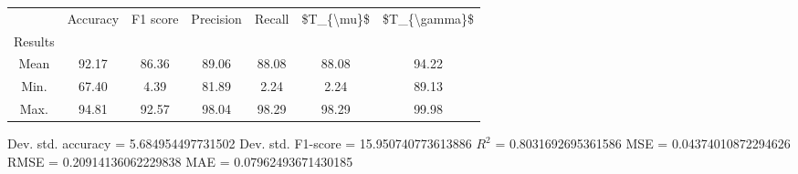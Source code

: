 \begin{tabular}{|c|c|c|c|c|c|c|}
\toprule
{} &  Accuracy &  F1 score &  Precision &  Recall &  \$T\_\{\textbackslash mu\}\$ &  \$T\_\{\textbackslash gamma\}\$ \\
Results &           &           &            &         &            &               \\
\hline
Mean    &     92.17 &     86.36 &      89.06 &   88.08 &      88.08 &         94.22 \\
Min.    &     67.40 &      4.39 &      81.89 &    2.24 &       2.24 &         89.13 \\
Max.    &     94.81 &     92.57 &      98.04 &   98.29 &      98.29 &         99.98 \\
\bottomrule
\end{tabular}

 Dev. std. accuracy = 5.684954497731502
 Dev. std. F1-score = 15.950740773613886
 $R^2$ = 0.8031692695361586
 MSE = 0.04374010872294626
 RMSE = 0.20914136062229838
 MAE = 0.07962493671430185